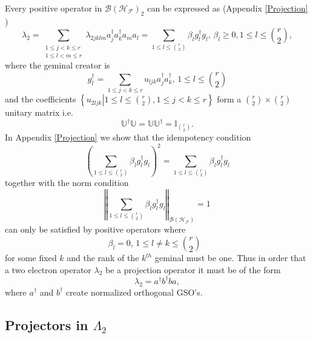 \documentclass[aps,preprint,amsfonts,amssymb,showpacs,showkeys]{revtex4}%
\begin{document}
Every positive operator in $\mathcal{B}\left(  \mathcal{H}_{\mathcal{F}%
}\right)  _{2}$ can be expressed as (Appendix \ref{Projection} )
\begin{equation}
\lambda_{2}=\sum_{\substack{1\leq j<k\leq r\\1\leq l<m\leq r}}\lambda
_{2jklm}a_{j}^{\dagger}a_{k}^{\dagger}a_{m}a_{l}=\sum_{1\leq l\leq\binom{r}%
{2}}\beta_{l}g_{l}^{\dagger}g_{l},\,\beta_{l}\geq0,1\leq l\leq\binom{r}{2},
\end{equation}
where the geminal creator is
\begin{equation}
g_{l}^{\dagger}=\sum_{1\leq j<k\leq r}u_{ljk}a_{j}^{\dagger}a_{k}^{\dagger
},\,1\leq l\leq\binom{r}{2}%
\end{equation}
and the coefficients $\left\{  \left.  u_{2ljk}\right\vert 1\leq l\leq
\binom{r}{2},1\leq j<k\leq r\right\}  $ form a $\binom{r}{2}\times\binom{r}%
{2}$ unitary matrix i.e.
\begin{equation}
\mathbb{U}^{\dagger}\mathbb{U}=\mathbb{UU}^{\dagger}=\mathbb{I}_{\binom{r}{2}%
}.
\end{equation}
In Appendix \ref{Projection} we show that the idempotency condition
\begin{equation}
\left(  \sum_{1\leq l\leq\binom{r}{2}}\beta_{l}g_{l}^{\dagger}g_{l}\right)
^{2}=\sum_{1\leq l\leq\binom{r}{2}}\beta_{l}g_{l}^{\dagger}g_{l}%
\end{equation}
together with the norm condition
\begin{equation}
\left\Vert \sum_{1\leq l\leq\binom{r}{2}}\beta_{l}g_{l}^{\dagger}%
g_{l}\right\Vert _{\mathcal{B}\left(  \mathcal{H}_{\mathcal{F}}\right)  }=1
\end{equation}
can only be satisfied by positive operators where
\begin{equation}
\beta_{l}=0,\,1\leq l\neq k\leq\binom{r}{2}\text{ }%
\end{equation}
for some fixed $k$ and the rank of the $k^{th}$ geminal must be one. Thus in
order that a two electron operator $\lambda_{2}$ be a projection operator it
must be of the form
\begin{equation}
\lambda_{2}=a^{\dagger}b^{\dagger}ba,
\end{equation}
where $a^{\dagger}$ and $b^{\dagger}$ create normalized orthogonal GSO's.

\subsection{Projectors in $\Lambda_{2}$ \label{Proj1&2}}
\end{document}
